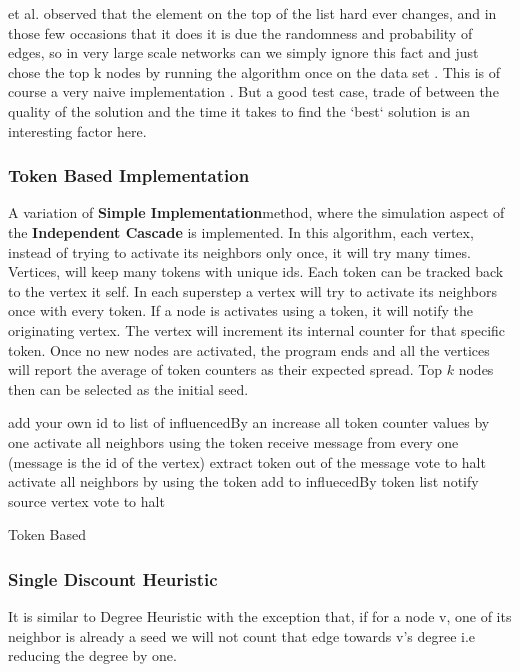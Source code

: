 \documentclass[english]{tktltiki}
\begin{document}
\cite{Leskovec07} et al. observed that the element on the top of the list hard ever changes, and in those few occasions that it does it is due the randomness and probability of edges, so in very large scale networks can we simply ignore this fact and just chose the top k nodes by running the algorithm once on the data set . This is of course a very naive implementation . But a good test case, trade of between the quality of the solution and the time it takes to find the `best` solution is an interesting factor here. 

\subsubsection{Token Based Implementation}
A variation of \textbf{Simple Implementation}method, where the simulation aspect of the \textbf{Independent Cascade} is implemented. In this algorithm, each vertex, instead of trying to activate its neighbors only once, it will try many times. Vertices, will keep many tokens with unique ids. Each token can be tracked back to the vertex it self. In each superstep a vertex will try to activate its neighbors once with every token. If a node is activates using a token, it will notify the originating vertex. The vertex will increment its internal counter for that specific token. Once no new nodes are activated, the program ends and all the vertices will report the average of token counters as their expected spread. Top $k$ nodes then can be selected as the initial seed.
\begin{algorithm}[ht!]
\begin{algorithmic}
	\State add your own id to list of influencedBy an increase all token counter values by one
		\State activate all neighbors using the token
	\EndFor
\Else
	\State receive message from every one (message is the id of the vertex)
		\State extract token out of the message
			\State vote to halt
		\Else
			\State activate all neighbors by using the token
			\State add to influecedBy token list 
			\State notify source vertex
			\State vote to halt
		\EndIf
		
	\EndFor
\EndIf
\end{algorithmic}
\caption{Token Based}
\end{algorithm}

\subsubsection{Single Discount Heuristic}
It is similar to Degree Heuristic with the exception that, if for a node v, one of its neighbor is already a seed we will not count that edge towards v's degree i.e reducing the degree by one.
\end{document}
